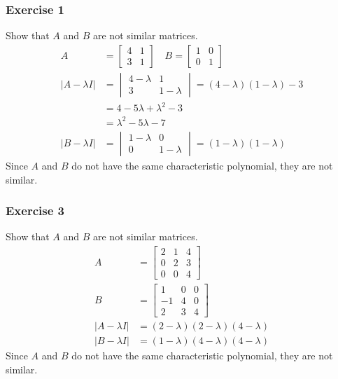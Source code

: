 \documentclass{math}
\begin{document}
\subsubsection*{Exercise 1}
Show that \( A \) and \( B \) are not similar matrices.
\begin{align*}
  A &= \begin{bmatrix}4 & 1 \\ 3 & 1\end{bmatrix} \quad
    B = \begin{bmatrix}1 & 0 \\ 0 & 1\end{bmatrix} \\
  |A-\lambda I| &= \begin{vmatrix}
    4-\lambda & 1 \\
    3 & 1-\lambda
  \end{vmatrix} = (4-\lambda)(1-\lambda)-3 \\
  &= 4-5\lambda+\lambda^2-3 \\
  &= \lambda^2-5\lambda-7 \\
  |B-\lambda I| &= \begin{vmatrix}
    1-\lambda & 0 \\
    0 & 1-\lambda
  \end{vmatrix} = (1-\lambda)(1-\lambda)
\end{align*}
Since \( A \) and \( B \) do not have the same characteristic polynomial, they
are not similar.

\subsubsection*{Exercise 3}
Show that \( A \) and \( B \) are not similar matrices.
\begin{align*}
  A &= \begin{bmatrix}
    2 & 1 & 4 \\
    0 & 2 & 3 \\
    0 & 0 & 4
  \end{bmatrix} \\
  B &= \begin{bmatrix}
    1 & 0 & 0 \\
    -1 & 4 & 0 \\
    2 & 3 & 4
  \end{bmatrix} \\
  |A-\lambda I| &= (2-\lambda)(2-\lambda)(4-\lambda) \\
  |B-\lambda I| &= (1-\lambda)(4-\lambda)(4-\lambda)
\end{align*}
Since \( A \) and \( B \) do not have the same characteristic polynomial, they
are not similar.
\end{document}
